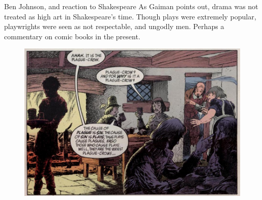 \documentclass{beamer}
\begin{document}
\begin{frame}{Ben Johnson, and reaction to Shakespeare}
      As Gaiman points out, drama was not treated as high art in Shakespeare's time. Though plays were extremely popular, playwrights were seen as not respectable, and ungodly men. Perhaps a commentary on comic books in the present.

      \begin{figure}[htp]
        \begin{center}
          \centering
          \includegraphics[scale=0.3]{plague.jpg}
        \end{center}
      \end{figure}
      
  \end{frame}
\end{document}
